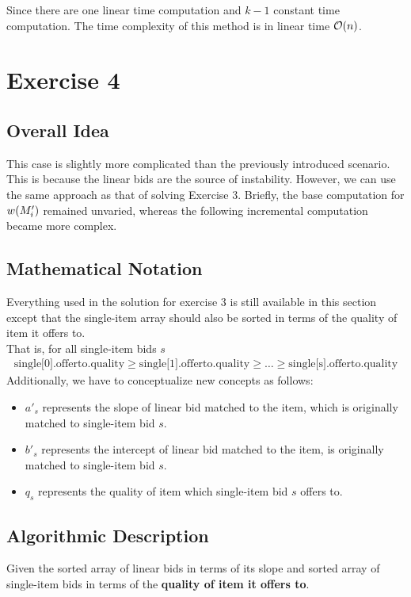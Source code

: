 \documentclass[11pt,a4paper]{article}
\begin{document}
Since there are one linear time computation and $k-1$ constant time
computation. The time complexity of this method is in linear time
$\mathcal{O}(n)$.

\newpage
\section{Exercise 4}
\subsection{Overall Idea}
This case is slightly more complicated than the previously introduced
scenario. This is because the linear bids are the source of instability.
However, we can use the same approach as that of solving Exercise 3. Briefly,
the base computation for $w(M'_i)$ remained unvaried, whereas the following
incremental computation became more complex.

\subsection{Mathematical Notation}
Everything used in the solution for exercise 3 is still available in this
section except that the single-item array should also be sorted in terms of
the quality of item it offers to. \\
That is, for all single-item bids $s$
\begin{align*} 
    \text{single[0].offerto.quality} \geq \text{single[1].offerto.quality}
    \geq \dots \geq \text{single[s].offerto.quality}
\end{align*}
Additionally, we have to conceptualize new concepts as follows:
\begin{itemize}
    \item{$a'_s$ represents the slope of linear bid matched to the item, which
        is originally matched to single-item bid $s$.}
    \item{$b'_s$ represents the intercept of linear bid matched to the item,
            is originally matched to single-item bid $s$.}
    \item{$q_s$ represents the quality of item which
        single-item bid $s$ offers to.}
\end{itemize}

\subsection{Algorithmic Description}
Given the sorted array of linear bids in terms of its slope and sorted array of
single-item bids in terms of the \textbf{quality of item it offers to}. 
\end{document}
